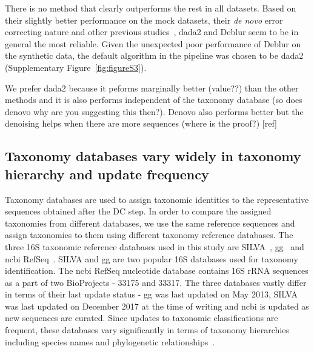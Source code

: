   There is no method that clearly outperforms the rest in all datasets.
  Based on their slightly better performance on the mock datasets, their \textit{de novo} error correcting nature and other previous studies~\cite{Nearing2018}, \ac{dada2} and Deblur seem to be in general the most reliable.
  Given the unexpected poor performance of Deblur on the synthetic data, the default algorithm in the pipeline was chosen to be \ac{dada2} (Supplementary Figure~\ref{fig:figureS3}).


  We prefer dada2 because it peforms marginally better (value??) than the other methods and it is also performs independent of the taxonomy database (so does denovo why are you suggesting this then?).
  Denovo also performs better but the denoising helps when there are more sequences (where is the proof?) [ref]

  \FloatBarrier

  \subsection*{Taxonomy databases vary widely in taxonomy hierarchy and update frequency}

  Taxonomy databases are used to assign taxonomic identities to the representative sequences obtained after the DC step.
  In order to compare the assigned taxonomies from different databases, we use the same reference sequences and assign taxonomies to them using different taxonomy reference databases.
  The three 16S taxonomic reference databases used in this study are SILVA~\cite{Quast2012}, \ac{gg}~\cite{DeSantis2006} and \ac{ncbi} RefSeq~\cite{Sayers2009}.
  SILVA and \ac{gg} are two popular 16S databases used for taxonomy identification.
  The \ac{ncbi} RefSeq nucleotide database contains 16S rRNA sequences as a part of two BioProjects - 33175 and 33317.
  The three databases vastly differ in terms of their last update status - \ac{gg} was last updated on May 2013, SILVA was last updated on December 2017 at the time of writing and \ac{ncbi} is updated as new sequences are curated.
  Since updates to taxonomic classifications are frequent, these databases vary significantly in terms of taxonomy hierarchies including species names and phylogenetic relationships~\cite{Balvociute2017}.

